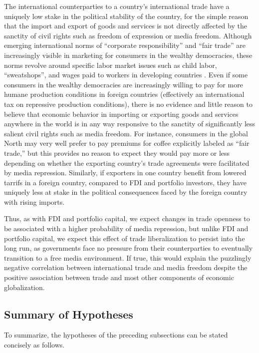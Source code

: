 \documentclass[12pt,a4paper]{article}\usepackage[]{graphicx}\usepackage[]{color}
\begin{document}
The international counterparties to a country's international trade have a uniquely low stake in the political stability of the country, for the simple reason that the import and export of goods and services is not directly affected by the sanctity of civil rights such as freedom of expression or media freedom. Although emerging international norms of “corporate responsibility” and “fair trade” are increasingly visible in marketing for consumers in the wealthy democracies, these norms revolve around specific labor market issues such as child labor, “sweatshops”, and wages paid to workers in developing countries \parencite{Moore:2004gy}. Even if some consumers in the wealthy democracies are increasingly willing to pay for more humane production conditions in foreign countries (effectively an international tax on repressive production conditions), there is no evidence and little reason to believe that economic behavior in importing or exporting goods and services anywhere in the world is in any way responsive to the sanctity of significantly less salient civil rights such as media freedom. For instance, consumers in the global North may very well prefer to pay premiums for coffee explicitly labeled as “fair trade,” but this provides no reason to expect they would pay more or less depending on whether the exporting country's trade agreements were facilitated by media repression. Similarly, if exporters in one country benefit from lowered tarrifs in a foreign country, compared to FDI and portfolio investors, they have uniquely less at stake in the political consequences faced by the foreign country with rising imports.

Thus, as with FDI and portfolio capital, we expect changes in trade openness to be associated with a higher probability of media repression, but unlike FDI and portfolio capital, we expect this effect of trade liberalization to persist into the long run, as governments face no pressure from their counterparties to eventually transition to a free media environment. If true, this would explain the puzzlingly negative correlation between international trade and media freedom despite the positive association between trade and most other components of economic globalization.

\subsection{Summary of Hypotheses}

To summarize, the hypotheses of the preceding subsections can be stated concisely as follows.
\end{document}
